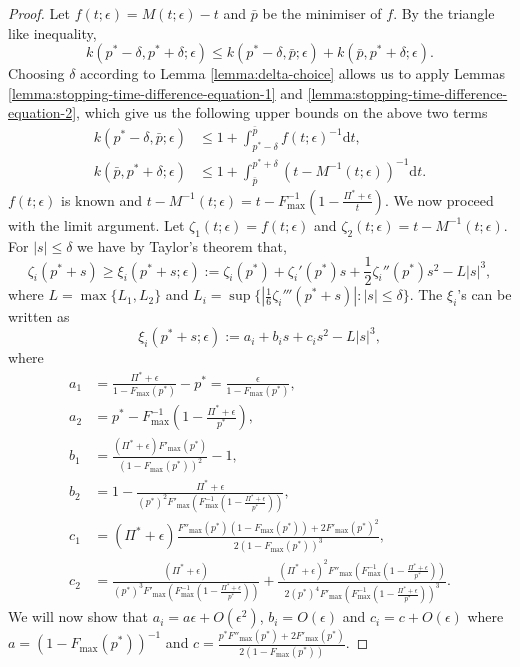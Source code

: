 \documentclass[10pt,a4paper]{amsart}
\begin{document}
\begin{proof}
    Let $f(t;\epsilon)=M(t;\epsilon)-t$ and $\bar{p}$ be the minimiser of $f$. By the triangle like inequality,
    $$
    k(p^*-\delta,p^*+\delta;\epsilon)\le k(p^*-\delta,\bar{p};\epsilon)+k(\bar{p},p^*+\delta;\epsilon).
    $$
    Choosing $\delta$ according to Lemma \ref{lemma:delta-choice} allows us to apply Lemmas \ref{lemma:stopping-time-difference-equation-1} and \ref{lemma:stopping-time-difference-equation-2}, which give us the following upper bounds on the above two terms
    \begin{align}
        k(p^*-\delta,\bar{p};\epsilon)&\le 1+\int_{p^*-\delta}^{\bar{p}}f(t;\epsilon)^{-1}\mathrm{d}t,\label{eq:bound-left}\\
        k(\bar{p},p^*+\delta;\epsilon)&\le1+\int_{\bar{p}}^{p^*+\delta}\left(t-M^{-1}(t;\epsilon)\right)^{-1}\mathrm{d}t.\label{eq:bound-right}
    \end{align}
    $f(t;\epsilon)$ is known and $t-M^{-1}(t;\epsilon)=t-F^{-1}_{\max}\left(1-\frac{\Pi^*+\epsilon}{t}\right)$.
    We now proceed with the limit argument.    
    Let $\zeta_1(t;\epsilon)=f(t;\epsilon)$ and $\zeta_2(t;\epsilon)=t-M^{-1}(t;\epsilon)$. For $|s|\le \delta$ we have by Taylor's theorem that,
    $$
    \zeta_i(p^*+s)\ge\xi_i(p^*+s;\epsilon):=\zeta_i(p^*)+\zeta_i'(p^*)s+\frac{1}{2}\zeta_i''(p^*)s^2-L|s|^3, 
    $$
    where $L=\max\{L_1,L_2\}$ and $L_i=\sup\{|\frac{1}{6}\zeta_i'''(p^*+s)|:|s|\le\delta\}$. The $\xi_i$'s can be written as
    $$
    \xi_i(p^*+s;\epsilon):=a_i+b_is+c_is^2-L|s|^3,
    $$
    where
    \begin{align*}    
        a_1&=\frac{\Pi^*+\epsilon}{1-F_{\max}(p^*)}-p^*=\frac{\epsilon}{1-F_{\max}(p^*)},\\
        a_2&=p^*-F^{-1}_{\max}\left(1-\frac{\Pi^*+\epsilon}{p^*}\right),\\
        b_1&=\frac{(\Pi^*+\epsilon)F'_{\max}(p^*)}{(1-F_{\max}(p^*))^2}-1,\\
        b_2&=1-\frac{\Pi^*+\epsilon}{(p^*)^2F'_{\max}\left(F^{-1}_{\max}\left(1-\frac{\Pi^*+\epsilon}{p^*}\right)\right)},\\
        c_1&=(\Pi^*+\epsilon)\frac{F''_{\max}(p^*)(1-F_{\max}(p^*))+2F'_{\max}(p^*)^2}{2(1-F_{\max}(p^*))^3},\\
        c_2&=\frac{(\Pi^*+\epsilon)}{(p^*)^3F'_{\max}\left(F^{-1}_{\max}\left(1-\frac{\Pi^*+\epsilon}{p^*}\right)\right)}+\frac{(\Pi^*+\epsilon)^2F''_{\max}\left(F^{-1}_{\max}\left(1-\frac{\Pi^*+\epsilon}{p^*}\right)\right)}{2(p^*)^4F'_{\max}\left(F^{-1}_{\max}\left(1-\frac{\Pi^*+\epsilon}{p^*}\right)\right)^3}.
    \end{align*}
    We will now show that $a_i=a\epsilon+O(\epsilon^2)$, $b_i=O(\epsilon)$ and $c_i=c+O(\epsilon)$ where $a=(1-F_{\max}(p^*))^{-1}$ and $c=\frac{p^*F''_{\max}(p^*)+2F'_{\max}(p^*)}{2(1-F_{\max}(p^*))}$. 
    

\end{proof}
\end{document}
